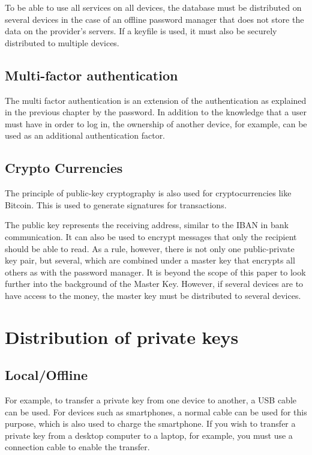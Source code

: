 \documentclass[12pt,oneside,a4paper,parskip]{scrbook}
\begin{document}
To be able to use all services on all devices, the database must be distributed on several devices in the case of an offline password manager that does not store the data on the provider's servers. If a keyfile is used, it must also be securely distributed to multiple devices.

\subsection{Multi-factor authentication}
The multi factor authentication is an extension of the authentication as explained in the previous chapter by the password. In addition to the knowledge that a user must have in order to log in, the ownership of another device, for example, can be used as an additional authentication factor. 

\subsection{Crypto Currencies}
The principle of public-key cryptography is also used for cryptocurrencies like Bitcoin. This is used to generate signatures for transactions. 

The public key represents the receiving address, similar to the IBAN in bank communication. It can also be used to encrypt messages that only the recipient should be able to read. As a rule, however, there is not only one public-private key pair, but several, which are combined under a master key that encrypts all others as with the password manager. It is beyond the scope of this paper to look further into the background of the Master Key. However, if several devices are to have access to the money, the master key must be distributed to several devices.


\section{Distribution of private keys}
\label{sec:distribution}

\subsection{Local/Offline}
For example, to transfer a private key from one device to another, a USB cable can be used. For devices such as smartphones, a normal cable can be used for this purpose, which is also used to charge the smartphone. If you wish to transfer a private key from a desktop computer to a laptop, for example, you must use a connection cable to enable the transfer.
\end{document}
